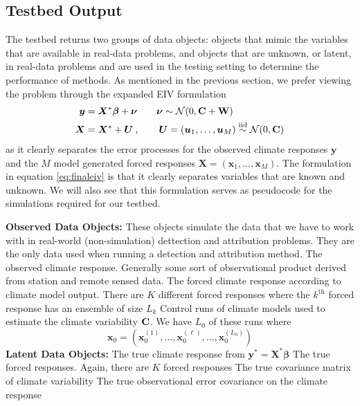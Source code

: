 \documentclass[11pt]{article}
\newcommand{\C}{\ensuremath{\text{Cov}}}
\def\*#1{\bm{#1}}
\def\C{\textbf{\text{C}}}
\def\W{\textbf{\text{W}}}
\begin{document}
\subsection{Testbed Output}
The testbed returns two groups of data objects: objects that mimic the variables that are available in real-data problems, and objects that are unknown, or latent, in real-data problems and are used in the testing setting to determine the performance of methods. As mentioned in the previous section, we prefer viewing the problem through the expanded EIV formulation 
\begin{align} \label{eq:finaleiv}
\*y &= \*X^* \*\beta + \*\nu \qquad \*\nu  \sim \mathcal{N}(0,\C + \W) \nonumber \\
\*X &= \*X^* + \*U \: , \qquad \*U = (\*u_1, \dots, \*u_M) \stackrel{\text{iid}}{\sim} \mathcal{N}(0,\C)
\end{align}
as it clearly separates the error processes for the observed climate responses $\*y$ and the $M$ model generated forced responses $\*X = (\*x_1, \dots, \*x_M)$. The formulation in equation \ref{eq:finaleiv} is that it clearly separates variables that are known and unknown. We will also see that this formulation serves as pseudocode for the simulations required for our testbed.

\begin{outline}
\1 \textbf{Observed Data Objects:} These objects simulate the data that we have to work with in real-world (non-simulation) dettection and attribution problems. They are the only data used when running a detection and attribution method.
\2 [$\*y$:] The observed climate response. Generally some sort of observational product derived from station and remote sensed data. 
\2 [$\*X$:] The forced climate response according to climate model output. There are $K$ different forced responses where the $k^{\text{th}}$ forced response has an ensemble of size $L_k$ 
\2 [$\*x_0$:] Control runs of climate models used to estimate the climate variability $\C$. We have $L_0$ of these runs where
\[
\*x_0 = (\*x_0^{(1)}, \dots, \*x_0^{(\ell)}, \dots, \*x_0^{(L_0)})
\]
\1 \textbf{Latent Data Objects:} 
\2 [$\*y^*$:] The true climate response from $\*y^* = \*X^* \*\beta$
\2 [$\*X^*$:] The true forced responses. Again, there are $K$ forced responses
\2 [$\C$:] The true covariance matrix of climate variability 
\2 [$\W$:] The true observational error covariance on the climate response
\end{outline}
\end{document}

